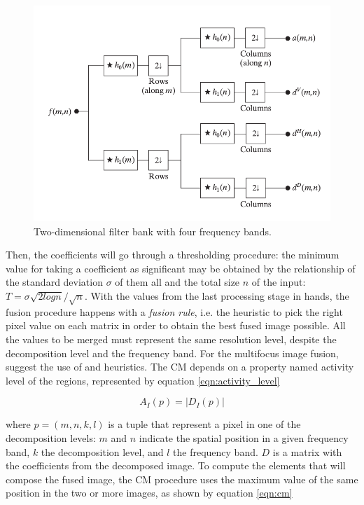 \begin{figure}[htb]
	\centering
	\caption{\label{fig:filter_banks}Two-dimensional filter bank with four frequency bands.}
	\begin{center}
	    \includegraphics[scale=0.4]{images/fig11.png}
	\end{center}
	\centering
\end{figure}

Then, the coefficients will go through a thresholding procedure: the minimum value for taking a coefficient as significant may be obtained by the relationship of the standard deviation $\sigma$ of them all and the total size $n$ of the input: $T = \sigma\sqrt{2logn}/\sqrt{n}$. With the values from the last processing stage in hands, the fusion procedure happens with a \emph{fusion rule}, i.e. the heuristic to pick the right pixel value on each matrix in order to obtain the best fused image possible. All the values to be merged must represent the same resolution level, despite the decomposition level and the frequency band. For the multifocus image fusion,  suggest the use of  and  heuristics. The CM depends on a property named activity level of the regions, represented by equation \ref{eqn:activity_level}

\begin{equation}
    \label{eqn:activity_level}
    A_{I}(p) = |D_{I}(p)|
\end{equation}

\noindent where $p = (m,n,k,l)$ is a tuple that represent a pixel in one of the decomposition levels: $m$ and $n$ indicate the spatial position in a given
frequency band, $k$ the decomposition level, and $l$ the frequency band. $D$ is a matrix with the coefficients from the decomposed image. To compute the elements that will compose the fused image, the CM procedure uses the maximum value of the same position in the two or more images, as shown by equation \ref{eqn:cm}

